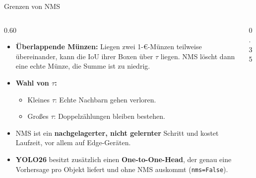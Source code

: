 \begin{frame}{Grenzen von NMS}
\footnotesize
\begin{columns}
\begin{column}{0.60\textwidth}
\begin{itemize}
  \item \textbf{Überlappende Münzen:} Liegen zwei 1-€-Münzen teilweise übereinander, kann die IoU ihrer Boxen über $\tau$ liegen. NMS löscht dann eine echte Münze, die Summe ist zu niedrig.
  \item \textbf{Wahl von $\tau$:}
  \begin{itemize}
    \item Kleines $\tau$: Echte Nachbarn gehen verloren.
    \item Großes $\tau$: Doppelzählungen bleiben bestehen.
  \end{itemize}
  \item NMS ist ein \textbf{nachgelagerter, nicht gelernter} Schritt und kostet Laufzeit, vor allem auf Edge-Geräten.
  \item \textbf{YOLO26} besitzt zusätzlich einen \textbf{One-to-One-Head}, der genau eine Vorhersage pro Objekt liefert und ohne NMS auskommt (\texttt{nms=False}).
\end{itemize}
\end{column}
\begin{column}{0.35\textwidth}
\centering
{}
\end{column}
\end{columns}
\end{frame}

\makequizpage{\QUIZURL}{\QUIZQRCODE}{\QUIZIMAGE}


